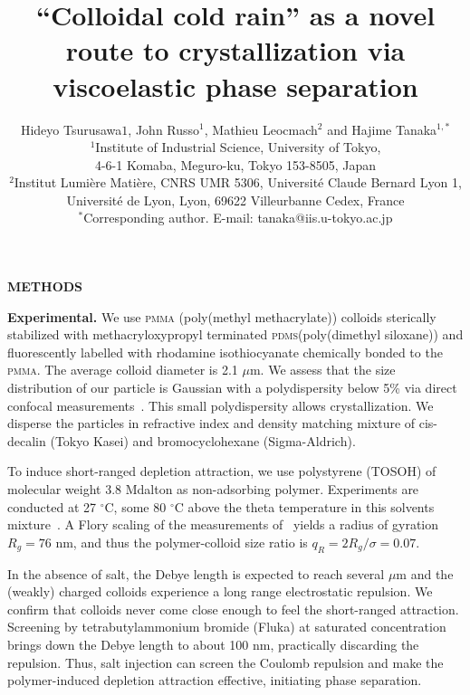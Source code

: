 \documentclass[12pt,onecolumn]{revtex4}
\begin{document}
\title{``Colloidal cold rain'' as a novel route to crystallization via viscoelastic phase separation} 

\author{Hideyo Tsurusawa$1$, John Russo$^1$, Mathieu Leocmach$^{2}$ and Hajime Tanaka$^{1,\ast}$ 
\\
\normalsize{$^1$Institute of Industrial Science, University of Tokyo,}\\
\normalsize{4-6-1 Komaba, Meguro-ku, Tokyo 153-8505, Japan}\\
\normalsize{$^2$Institut Lumière Matière, CNRS UMR 5306, Université Claude Bernard Lyon 1, }\\
\normalsize{Université de Lyon, Lyon, 69622 Villeurbanne Cedex, France}\\
\normalsize{$^\ast$Corresponding author. E-mail: tanaka@iis.u-tokyo.ac.jp}}

\maketitle



\noindent
{\bf METHODS}

\noindent
{\bf Experimental.}
We use \textsc{pmma} (poly(methyl methacrylate)) colloids sterically stabilized with methacryloxypropyl terminated \textsc{pdms}(poly(dimethyl siloxane)) and fluorescently labelled with rhodamine isothiocyanate chemically bonded to the \textsc{pmma}. 
The average colloid diameter is 2.1 $\mu$m. 
We assess that the size distribution of our particle is Gaussian with a polydispersity below 5\% via direct confocal measurements~\cite{Leocmach2013}.
This small polydispersity allows crystallization.
We disperse the particles in refractive index and density matching mixture of cis-decalin (Tokyo Kasei) and bromocyclohexane (Sigma-Aldrich).

To induce short-ranged depletion attraction, we use polystyrene (TOSOH) of molecular weight 3.8 Mdalton as non-adsorbing polymer. 
Experiments are conducted at 27 $^\circ$C, some 80 $^\circ$C above the theta temperature in this solvents mixture~\cite{Royall2007}. A Flory scaling of the measurements of~\cite{lu2008gelation} yields a radius of gyration $R_g=76$ nm, and thus the polymer-colloid size ratio is $q_R=2R_g/\sigma=0.07$.

In the absence of salt, the Debye length is expected to reach several $\mu$m and the (weakly) charged colloids experience a long range electrostatic repulsion. We confirm that colloids never come close enough to feel the short-ranged attraction. Screening by tetrabutylammonium bromide (Fluka) at saturated concentration brings down the Debye length to about 100 nm, practically discarding the repulsion. 
Thus, salt injection can screen the Coulomb repulsion and make the polymer-induced depletion attraction effective, initiating phase separation. 
\end{document}
